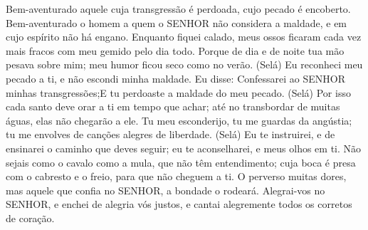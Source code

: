 
{\PP 
  Bem-aventurado aquele cuja transgressão é perdoada, cujo pecado é encoberto.
  Bem-aventurado o homem a quem o SENHOR não considera a maldade, e em cujo espírito não há engano.
  Enquanto fiquei calado, meus ossos ficaram cada vez mais fracos com meu gemido pelo dia todo.
  Porque de dia e de noite tua mão pesava sobre mim; meu humor ficou seco como no verão. (Selá)
  Eu reconheci meu pecado a ti, e não escondi minha maldade. Eu disse: Confessarei ao SENHOR minhas transgressões;E tu perdoaste a maldade do meu pecado. (Selá)
  Por isso cada santo deve orar a ti em
{} tempo que achar; até no transbordar de muitas águas, elas não chegarão a ele.
  Tu
{} meu esconderijo, tu me guardas da angústia; tu me envolves de canções alegres de liberdade. (Selá)
  Eu te instruirei, e de ensinarei o caminho que deves seguir; eu te aconselharei, e
{} meus olhos em ti.
  Não sejais como o cavalo
{} como a mula, que não têm entendimento; cuja boca é presa com o cabresto e o freio, para que não cheguem a ti.
  O perverso
{} muitas dores, mas aquele que confia no SENHOR, a bondade o rodeará.
  Alegrai-vos no SENHOR, e enchei de alegria vós justos, e cantai alegremente todos os corretos de coração.
\par }

